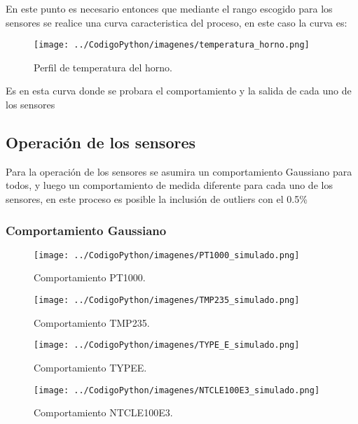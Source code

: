 \documentclass[conference]{IEEEtran}
\begin{document}
En este punto es necesario entonces que mediante el rango escogido para los sensores se realice una curva caracteristica del proceso, en este caso la curva es:


\begin{figure}[h!]
	\centering
	\texttt{[image: ../CodigoPython/imagenes/temperatura\_horno.png]}
	\caption{Perfil de temperatura del horno.}
	\label{fig:5}
\end{figure}

Es en esta curva donde se probara el comportamiento y la salida de cada uno de los sensores

\subsection{Operación de los sensores}

Para la operación de los sensores se asumira un comportamiento Gaussiano para todos, y luego un comportamiento de medida diferente para cada uno de los sensores, en este proceso es posible la inclusión de outliers con el 0.5\%

\subsubsection{Comportamiento Gaussiano}

\begin{figure}[h!]
	\centering
	\texttt{[image: ../CodigoPython/imagenes/PT1000\_simulado.png]}
	\caption{Comportamiento PT1000.}
	\label{fig:PT1000_simulado}
\end{figure}

\begin{figure}[h!]
	\centering
	\texttt{[image: ../CodigoPython/imagenes/TMP235\_simulado.png]}
	\caption{Comportamiento TMP235.}
	\label{fig:TMP235_simulado}
\end{figure}

\begin{figure}[h!]
	\centering
	\texttt{[image: ../CodigoPython/imagenes/TYPE\_E\_simulado.png]}
	\caption{Comportamiento TYPEE.}
	\label{fig:TYPE_E_simulado}
\end{figure}

\begin{figure}[h!]
	\centering
	\texttt{[image: ../CodigoPython/imagenes/NTCLE100E3\_simulado.png]}
	\caption{Comportamiento NTCLE100E3.}
	\label{fig:NTCLE100E3_simulado}
\end{figure}
\end{document}
